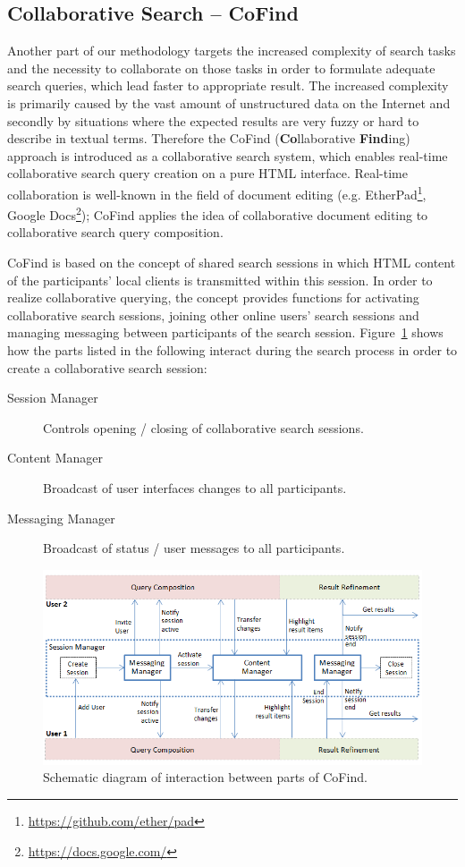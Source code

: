\documentclass[runningheads,a4paper]{llncs} \usepackage[utf8]{inputenc}
\begin{document}
\subsection{Collaborative Search -- CoFind}
Another part of our methodology targets the increased complexity of search tasks and the necessity to collaborate on those tasks in order to formulate adequate search queries, which lead faster to appropriate result. The increased
complexity is primarily caused by the vast amount of unstructured data on the Internet and secondly by situations where the expected results are very fuzzy or hard to describe in textual terms. Therefore the CoFind (\textbf{Co}llaborative \textbf{Find}ing) approach is introduced as a collaborative search system, which enables real-time collaborative search query creation on a pure HTML interface. Real-time collaboration is well-known in the field of document editing (e.g. EtherPad\footnote{\url{https://github.com/ether/pad}}, Google  Docs\footnote{\url{https://docs.google.com/}}); CoFind applies the idea of collaborative document editing to collaborative search query composition.

CoFind is based on the concept of shared search sessions in which HTML content of the participants' local clients is transmitted within this session. In order to realize collaborative querying, the concept provides functions for activating collaborative search sessions, joining other online users' search sessions and managing messaging between participants of the search session. Figure~\ref{fig:cofind} shows how the parts listed in the following interact during the search process in order to create a collaborative search session:
\begin{description}
  \item [Session Manager] Controls opening / closing of collaborative search sessions.
  \item [Content Manager] Broadcast of user interfaces changes to all participants.
  \item [Messaging Manager] Broadcast of status / user messages to all participants.
\end{description}

\begin{figure}[h!]
  \centering
    \includegraphics[width=0.75\linewidth]{resources/cofind-workflow.png}
  \caption{Schematic diagram of interaction between parts of CoFind.}
  \label{fig:cofind}
\end{figure}
 
\end{document}
